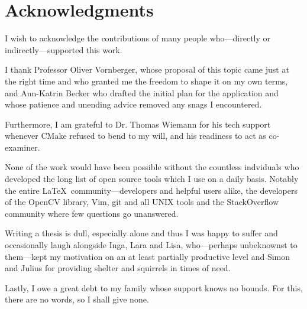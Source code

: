 \chapter*{Acknowledgments}

I wish to acknowledge the contributions of many people who---directly or
indirectly---supported this work. 

I thank Professor Oliver Vornberger, whose proposal of this topic came just at
the right time and who granted me the freedom to shape it on my own terms, and
Ann-Katrin Becker who drafted the initial plan for the application and
whose patience and unending advice removed any snags I encountered.

Furthermore, I am grateful to Dr. Thomas Wiemann for his tech support
whenever CMake refused to bend to my will, and his readiness to act as
co-examiner.

None of the work would have been possible without the countless indviduals who
developed the long list of open source tools which I use on a daily basis.
Notably the entire \LaTeX\ community---developers and helpful users alike, the
developers of the OpenCV library, Vim, git and all UNIX tools and the
StackOverflow community where few questions go unanswered.

Writing a thesis is dull, especially alone and thus I was happy to suffer and
occasionally laugh alongside Inga, Lara and Lisa, who---perhaps unbeknownst to
them---kept my motivation on an at least partially productive level and Simon
and Julius for providing shelter and squirrels in times of need.


Lastly, I owe a great debt to my family whose support knows no bounds. For this,
there are no words, so I shall give none.
